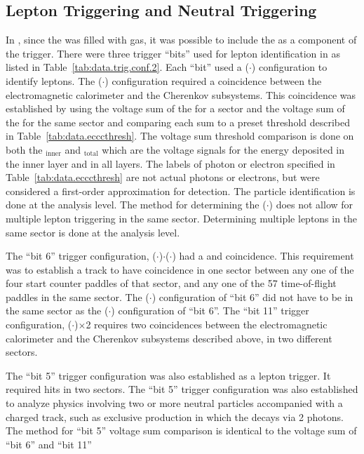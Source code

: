 \subsection{Lepton Triggering and Neutral Triggering}\label{sec.data.trig.lepton}
		In , since the  was filled with gas, it was possible to include the  as a component of the trigger. 
		There were three trigger ``bits'' used for lepton identification in  as listed in Table~\ref{tab:data.trig.conf.2}. Each ``bit'' used a ($\cdot$) configuration to identify leptons. The ($\cdot$) configuration required a coincidence between the electromagnetic calorimeter and the Cherenkov subsystems. This coincidence was established by using the voltage sum of the  for a sector and the voltage sum of the  for the same sector and comparing each sum to a preset threshold described in Table~\ref{tab:data.ecccthresh}. The  voltage sum threshold comparison is done on both the $_\mathrm{inner}$ and $_{\mathrm{total}}$ which are the  voltage signals for the energy deposited in the inner layer and in all layers. The labels of photon or electron specified in Table~\ref{tab:data.ecccthresh} are not actual photons or electrons, but were considered a first-order approximation for detection. The particle identification is done at the analysis level. The method for determining the ($\cdot$) does not allow for multiple lepton triggering in the same sector. Determining multiple leptons in the same sector is done at the analysis level. 
		
		The ``bit 6'' trigger configuration, ($\cdot$)$\cdot$($\cdot$) had a  and  coincidence. This requirement was to establish a track to have coincidence in one sector between any one of the four start counter paddles of that sector, and any one of the 57 time-of-flight paddles in the same sector. The ($\cdot$) configuration of ``bit 6'' did not have to be in the same sector as the ($\cdot$) configuration of ``bit 6''. The ``bit 11'' trigger configuration, ($\cdot$)$\times$2 requires two coincidences between the electromagnetic calorimeter and the Cherenkov subsystems described above, in two different sectors. 
		
		The ``bit 5'' trigger configuration was also established as a lepton trigger. It required  hits in two sectors. The ``bit 5'' trigger configuration was also established to analyze physics involving two or more neutral particles accompanied with a charged track, such as exclusive \piz production in which the \piz decays via 2 photons. The method for ``bit 5'' voltage sum comparison is identical to the  voltage sum of ``bit 6'' and ``bit 11''
		
